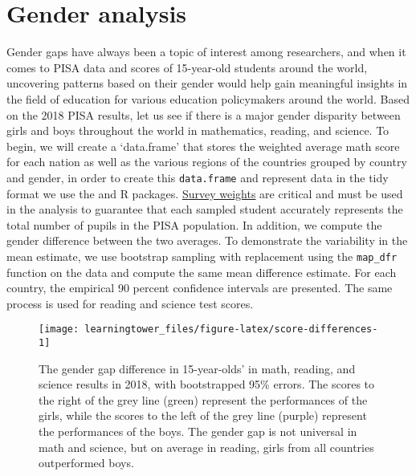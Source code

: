 \section{Gender analysis}\label{gender-analysis}

Gender gaps have always been a topic of interest among researchers, and when it comes to PISA data and scores of 15-year-old students around the world, uncovering patterns based on their gender would help gain meaningful insights in the field of education for various education policymakers around the world. Based on the 2018 PISA results, let us see if there is a major gender disparity between girls and boys throughout the world in mathematics, reading, and science. To begin, we will create a `data.frame' that stores the weighted average math score for each nation as well as the various regions of the countries grouped by country and gender, in order to create this \texttt{data.frame} and represent data in the tidy format we use the  \citep{tidyverse} and  \citep{dplyr} R packages. \href{https://www.oecd.org/pisa/data/2015-technical-report/PISA-2015-Technical-Report-Chapter-8-Survey-Weighting.pdf}{Survey weights} are critical and must be used in the analysis to guarantee that each sampled student accurately represents the total number of pupils in the PISA population. In addition, we compute the gender difference between the two averages. To demonstrate the variability in the mean estimate, we use bootstrap sampling with replacement using the \texttt{map\_dfr} function on the data and compute the same mean difference estimate. For each country, the empirical 90 percent confidence intervals are presented. The same process is used for reading and science test scores.

\begin{figure}[H]
\texttt{[image: learningtower\_files/figure-latex/score-differences-1]} \caption{The gender gap difference in 15-year-olds' in math, reading, and science results in 2018, with bootstrapped 95\% errors. The scores to the right of the grey line (green) represent the performances of the girls, while the scores to the left of the grey line (purple) represent the performances of the boys. The gender gap is not universal in math and science, but on average in reading, girls from all countries outperformed boys.}\label{fig:score-differences}
\end{figure}

